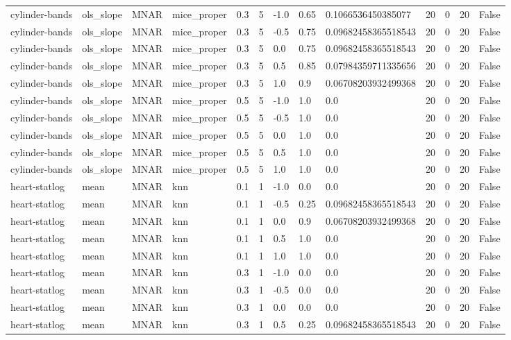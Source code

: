 \begin{tabular}{lllllllllllll}
cylinder-bands & ols\_slope & MNAR & mice\_proper & 0.3 & 5 & -1.0 & 0.65 & 0.1066536450385077 & 20 & 0 & 20 & False \\
cylinder-bands & ols\_slope & MNAR & mice\_proper & 0.3 & 5 & -0.5 & 0.75 & 0.09682458365518543 & 20 & 0 & 20 & False \\
cylinder-bands & ols\_slope & MNAR & mice\_proper & 0.3 & 5 & 0.0 & 0.75 & 0.09682458365518543 & 20 & 0 & 20 & False \\
cylinder-bands & ols\_slope & MNAR & mice\_proper & 0.3 & 5 & 0.5 & 0.85 & 0.07984359711335656 & 20 & 0 & 20 & False \\
cylinder-bands & ols\_slope & MNAR & mice\_proper & 0.3 & 5 & 1.0 & 0.9 & 0.06708203932499368 & 20 & 0 & 20 & False \\
cylinder-bands & ols\_slope & MNAR & mice\_proper & 0.5 & 5 & -1.0 & 1.0 & 0.0 & 20 & 0 & 20 & False \\
cylinder-bands & ols\_slope & MNAR & mice\_proper & 0.5 & 5 & -0.5 & 1.0 & 0.0 & 20 & 0 & 20 & False \\
cylinder-bands & ols\_slope & MNAR & mice\_proper & 0.5 & 5 & 0.0 & 1.0 & 0.0 & 20 & 0 & 20 & False \\
cylinder-bands & ols\_slope & MNAR & mice\_proper & 0.5 & 5 & 0.5 & 1.0 & 0.0 & 20 & 0 & 20 & False \\
cylinder-bands & ols\_slope & MNAR & mice\_proper & 0.5 & 5 & 1.0 & 1.0 & 0.0 & 20 & 0 & 20 & False \\
heart-statlog & mean & MNAR & knn & 0.1 & 1 & -1.0 & 0.0 & 0.0 & 20 & 0 & 20 & False \\
heart-statlog & mean & MNAR & knn & 0.1 & 1 & -0.5 & 0.25 & 0.09682458365518543 & 20 & 0 & 20 & False \\
heart-statlog & mean & MNAR & knn & 0.1 & 1 & 0.0 & 0.9 & 0.06708203932499368 & 20 & 0 & 20 & False \\
heart-statlog & mean & MNAR & knn & 0.1 & 1 & 0.5 & 1.0 & 0.0 & 20 & 0 & 20 & False \\
heart-statlog & mean & MNAR & knn & 0.1 & 1 & 1.0 & 1.0 & 0.0 & 20 & 0 & 20 & False \\
heart-statlog & mean & MNAR & knn & 0.3 & 1 & -1.0 & 0.0 & 0.0 & 20 & 0 & 20 & False \\
heart-statlog & mean & MNAR & knn & 0.3 & 1 & -0.5 & 0.0 & 0.0 & 20 & 0 & 20 & False \\
heart-statlog & mean & MNAR & knn & 0.3 & 1 & 0.0 & 0.0 & 0.0 & 20 & 0 & 20 & False \\
heart-statlog & mean & MNAR & knn & 0.3 & 1 & 0.5 & 0.25 & 0.09682458365518543 & 20 & 0 & 20 & False \\

\end{tabular}

